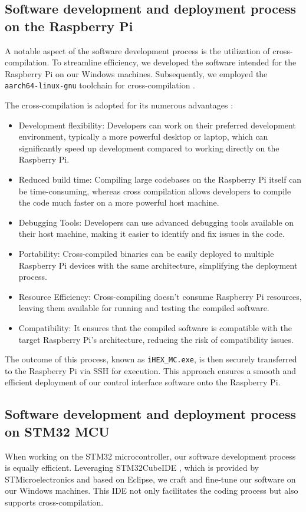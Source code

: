 \subsection{Software development and deployment process on the Raspberry Pi}

A notable aspect of the software development process is the utilization of cross-compilation. To streamline efficiency, we developed the software intended for the Raspberry Pi on our Windows machines. Subsequently, we employed the \texttt{aarch64-linux-gnu} toolchain for cross-compilation \cite{R30}.

The cross-compilation is adopted for its numerous advantages \cite{R31}:
\begin{itemize}
    \item Development flexibility: Developers can work on their preferred development environment, typically a more powerful desktop or laptop, which can significantly speed up development compared to working directly on the Raspberry Pi.
    \item Reduced build time: Compiling large codebases on the Raspberry Pi itself can be time-consuming, whereas cross compilation allows developers to compile the code much faster on a more powerful host machine.
    \item Debugging Tools: Developers can use advanced debugging tools available on their host machine, making it easier to identify and fix issues in the code.
    \item Portability: Cross-compiled binaries can be easily deployed to multiple Raspberry Pi devices with the same architecture, simplifying the deployment process.
    \item Resource Efficiency: Cross-compiling doesn't consume Raspberry Pi resources, leaving them available for running and testing the compiled software.
    \item Compatibility: It ensures that the compiled software is compatible with the target Raspberry Pi's architecture, reducing the risk of compatibility issues.
\end{itemize}

The outcome of this process, known as \texttt{iHEX\_MC.exe}, is then securely transferred to the Raspberry Pi via SSH for execution. This approach ensures a smooth and efficient deployment of our control interface software onto the Raspberry Pi.

\subsection{Software development and deployment process on STM32 MCU}
When working on the STM32 microcontroller, our software development process is equally efficient. Leveraging STM32CubeIDE \cite{R15}, which is provided by STMicroelectronics and based on Eclipse, we craft and fine-tune our software on our Windows machines. This IDE not only facilitates the coding process but also supports cross-compilation. 

